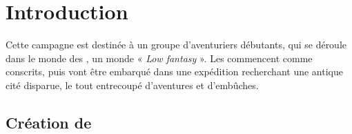\documentclass[a4paper,10pt,openany]{book}
\begin{document}
\tableofcontents

\chapter{Introduction}

Cette campagne est destinée à un groupe d’aventuriers débutants, qui se déroule dans le monde des \Royaumes, un monde « \emph{Low fantasy} ».
Les \PJs commencent comme conscrits, puis vont être embarqué dans une expédition recherchant une antique cité disparue, le tout entrecoupé
d’aventures et d’embûches.

\section{Création de \PJs}
\end{document}
